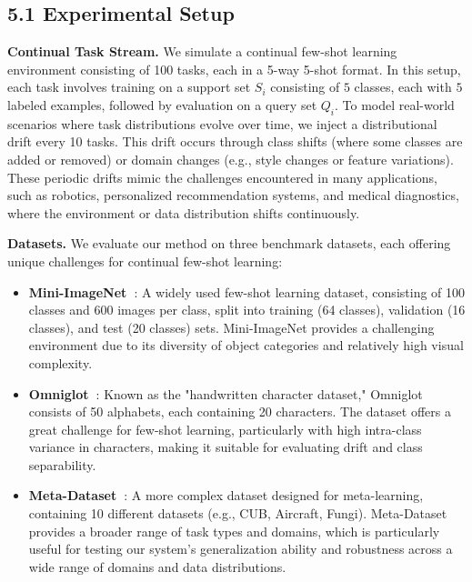 \documentclass[conference]{IEEEtran}
\begin{document}
\subsection{5.1 Experimental Setup}

\textbf{Continual Task Stream.}  
We simulate a continual few-shot learning environment consisting of 100 tasks, each in a 5-way 5-shot format. In this setup, each task involves training on a support set $S_i$ consisting of $5$ classes, each with $5$ labeled examples, followed by evaluation on a query set $Q_i$. To model real-world scenarios where task distributions evolve over time, we inject a distributional drift every 10 tasks. This drift occurs through class shifts (where some classes are added or removed) or domain changes (e.g., style changes or feature variations). These periodic drifts mimic the challenges encountered in many applications, such as robotics, personalized recommendation systems, and medical diagnostics, where the environment or data distribution shifts continuously.

\textbf{Datasets.}  
We evaluate our method on three benchmark datasets, each offering unique challenges for continual few-shot learning:

\begin{itemize}
    \item \textbf{Mini-ImageNet~\cite{vinyals2016matching}}: A widely used few-shot learning dataset, consisting of 100 classes and 600 images per class, split into training (64 classes), validation (16 classes), and test (20 classes) sets. Mini-ImageNet provides a challenging environment due to its diversity of object categories and relatively high visual complexity.
    \item \textbf{Omniglot~\cite{lake2015human}}: Known as the "handwritten character dataset," Omniglot consists of 50 alphabets, each containing 20 characters. The dataset offers a great challenge for few-shot learning, particularly with high intra-class variance in characters, making it suitable for evaluating drift and class separability.
    \item \textbf{Meta-Dataset~\cite{triantafillou2019meta}}: A more complex dataset designed for meta-learning, containing 10 different datasets (e.g., CUB, Aircraft, Fungi). Meta-Dataset provides a broader range of task types and domains, which is particularly useful for testing our system's generalization ability and robustness across a wide range of domains and data distributions.
\end{itemize}
\end{document}
